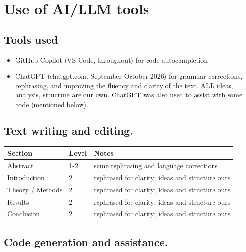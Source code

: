 \documentclass[amssymb,twocolumn,aps]{revtex4}
\begin{document}
\section{Use of AI/LLM tools}
\subsection{Tools used}
\begin{itemize}
    \item GitHub Copilot (VS Code, throughout) for code autocompletion
    \item ChatGPT (chatgpt.com, September-October 2026) for grammar corrections, rephrasing, and improving the fluency and clarity of the text. ALL ideas, analysis, structure are our own. ChatGPT was also used to assist with some code (mentioned below).
\end{itemize}

\subsection{Text writing and editing.}
\begin{tabular}{llp{7cm}}
    Section          & Level & Notes                                           \\ \hline
    Abstract         & 1-2   & some rephrasing and language corrections        \\
    Introduction     & 2     & rephrased for clarity; ideas and structure ours \\
    Theory / Methods & 2     & rephrased for clarity; ideas and structure ours \\
    Results          & 2     & rephrased for clarity; ideas and structure ours \\
    Conclusion       & 2     & rephrased for clarity; ideas and structure ours \\
\end{tabular}

\subsection{Code generation and assistance.}
\end{document}
